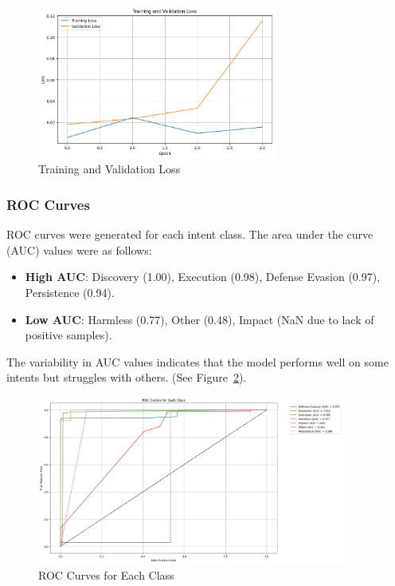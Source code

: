 \begin{figure}[h]
    \centering
    \includegraphics[width=0.7\textwidth]{../figures/plots/section4/Training_Validation_loss.png}
    \caption{Training and Validation Loss}
    \label{fig:loss}
\end{figure}

\subsubsection*{ROC Curves}
ROC curves were generated for each intent class. The area under the curve (AUC) values were as follows:
\begin{itemize}
    \item \textbf{High AUC}: Discovery (1.00), Execution (0.98), Defense Evasion (0.97), Persistence (0.94).
    \item \textbf{Low AUC}: Harmless (0.77), Other (0.48), Impact (NaN due to lack of positive samples).
\end{itemize}
The variability in AUC values indicates that the model performs well on some intents but struggles with others. (See Figure~\ref{fig:roc}).

\begin{figure}[h]
    \centering
    \includegraphics[width=0.9\textwidth]{../figures/plots/section4/ROC_Curve.png}
    \caption{ROC Curves for Each Class}
    \label{fig:roc}
\end{figure}

